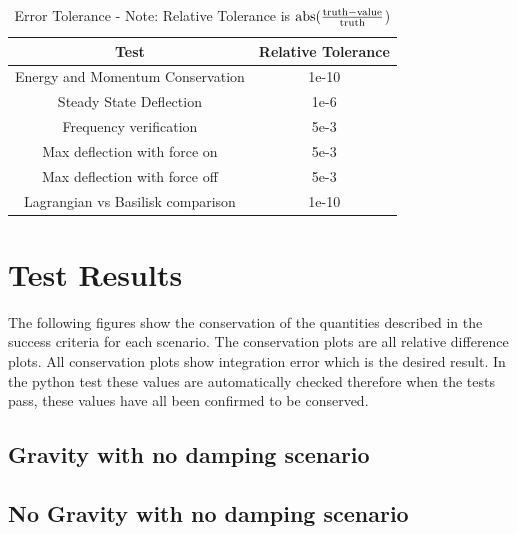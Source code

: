 \begin{table}[htbp]
	\caption{Error Tolerance - Note: Relative Tolerance is $\textnormal{abs}(\frac{\textnormal{truth} - \textnormal{value}}{\textnormal{truth}}$)}
	\label{tab:errortol}
	\centering \fontsize{10}{10}\selectfont
	\begin{tabular}{| c | c |} %
		\hline
		Test   & Relative Tolerance \\
		\hline
		Energy and Momentum Conservation & 1e-10 \\
		\hline
		Steady State Deflection & 1e-6 \\
		\hline
		Frequency verification & 5e-3 \\
		\hline
		Max deflection with force on & 5e-3 \\
		\hline
		Max deflection with force off & 5e-3 \\
		\hline
		Lagrangian vs Basilisk comparison & 1e-10 \\
		\hline	
	\end{tabular}
\end{table}

\clearpage

\section{Test Results}

The following figures show the conservation of the quantities described in the success criteria for each scenario. The conservation plots are all relative difference plots. All conservation plots show integration error which is the desired result. In the python test these values are automatically checked therefore when the tests pass, these values have all been confirmed to be conserved. 

\subsection{Gravity with no damping scenario}




\clearpage

\subsection{No Gravity with no damping scenario}






\clearpage

